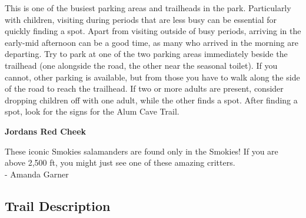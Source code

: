 \documentclass[
  letterpaper,
  DIV=11,
  numbers=noendperiod]{scrreprt}
\begin{document}
This is one of the busiest parking areas and trailheads in the park.
Particularly with children, visiting during periods that are less busy
can be essential for quickly finding a spot. Apart from visiting outside
of busy periods, arriving in the early-mid afternoon can be a good time,
as many who arrived in the morning are departing. Try to park at one of
the two parking areas immediately beside the trailhead (one alongside
the road, the other near the seasonal toilet). If you cannot, other
parking is available, but from those you have to walk along the side of
the road to reach the trailhead. If two or more adults are present,
consider dropping children off with one adult, while the other finds a
spot. After finding a spot, look for the signs for the Alum Cave Trail.

\begin{tcolorbox}[enhanced jigsaw, opacityback=0, bottomrule=.15mm, colframe=quarto-callout-note-color-frame, breakable, arc=.35mm, leftrule=.75mm, rightrule=.15mm, toprule=.15mm, left=2mm, colback=white]
\begin{minipage}[t]{5.5mm}
\textcolor{quarto-callout-note-color}{\faInfo}
\end{minipage}%
\begin{minipage}[t]{\textwidth - 5.5mm}

\vspace{-3mm}\textbf{Jordans Red Cheek}\vspace{3mm}

These iconic Smokies salamanders are found only in the Smokies! If you
are above 2,500 ft, you might just see one of these amazing critters.\\
- Amanda Garner

\end{minipage}%
\end{tcolorbox}

\subsection{Trail Description}\label{trail-description-29}
\end{document}

